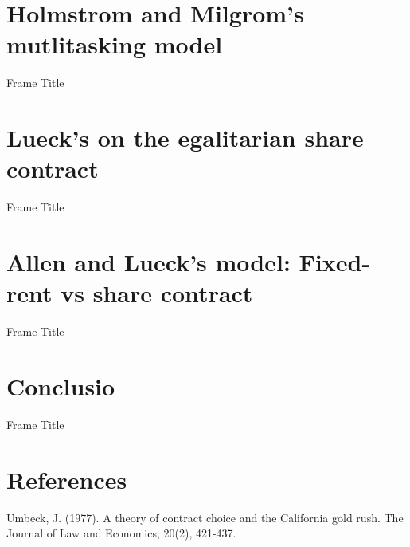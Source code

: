 \documentclass[10pt]{beamer}
\begin{document}
\section{Holmstrom and Milgrom's mutlitasking model}
\begin{frame}{Frame Title}
    
\end{frame}

\section{Lueck's on the egalitarian share contract}
\begin{frame}{Frame Title}
    
\end{frame}

\section{Allen and Lueck's model: Fixed-rent vs share contract}
\begin{frame}{Frame Title}
    
\end{frame}

\section{Conclusio}
\begin{frame}{Frame Title}
    
\end{frame}

\section{References}
\begin{frame}
Umbeck, J. (1977). A theory of contract choice and the California gold rush. The Journal of Law and Economics, 20(2), 421-437.\\
\end{frame}
\end{document}
